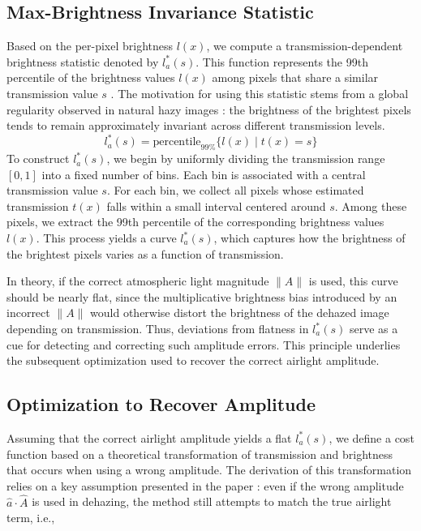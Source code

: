\documentclass[conference]{IEEEtran}
\begin{document}




\subsection{Max-Brightness Invariance Statistic}
Based on the per-pixel brightness \( l(x) \), we compute a transmission-dependent brightness statistic denoted by \( l^*_a(s) \). This function represents the 99th percentile of the brightness values \( l(x) \) among pixels that share a similar transmission value \( s \) \cite{airlight}. The motivation for using this statistic stems from a global regularity observed in natural hazy images \cite{airlight}: the brightness of the brightest pixels tends to remain approximately invariant across different transmission levels.
\begin{equation}
\label{brightness_statistic}
l^*_a(s) = \text{percentile}_{99\%} \{ l(x) \mid t(x) = s \}
\end{equation}
To construct \( l^*_a(s) \), we begin by uniformly dividing the transmission range \([0, 1]\) into a fixed number of bins. Each bin is associated with a central transmission value \( s \). For each bin, we collect all pixels whose estimated transmission \( t(x) \) falls within a small interval centered around \( s \). Among these pixels, we extract the 99th percentile of the corresponding brightness values \( l(x) \). This process yields a curve \( l^*_a(s) \), which captures how the brightness of the brightest pixels varies as a function of transmission.

In theory, if the correct atmospheric light magnitude \( \|A\| \) is used, this curve should be nearly flat, since the multiplicative brightness bias introduced by an incorrect \( \|A\| \)  would otherwise distort the brightness of the dehazed image depending on transmission. Thus, deviations from flatness in \( l^*_a(s) \) serve as a cue for detecting and correcting such amplitude errors. This principle underlies the subsequent optimization used to recover the correct airlight amplitude.

\subsection{Optimization to Recover Amplitude}

Assuming that the correct airlight amplitude yields a flat \( l^*_a(s) \), we define a cost function based on a theoretical transformation of transmission and brightness that occurs when using a wrong amplitude. The derivation of this transformation relies on a key assumption presented in the paper \cite{airlight} : even if the wrong amplitude \( \hat{a} \cdot \hat{A}\) is used in dehazing, the method still attempts to match the true airlight term, i.e.,
\end{document}
